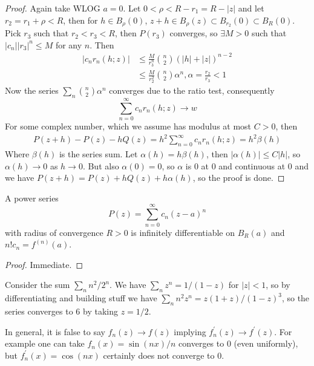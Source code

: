 \begin{proof}
    Again take WLOG $a=0$.
    Let $0<\rho<R-r_1=R-|z|$ and let $r_2=r_1+\rho<R$, then for $h\in B_\rho(0)$, $z+h\in B_\rho(z)\subset B_{r_2}(0)\subset B_R(0)$.
    Pick $r_3$ such that $r_2<r_3<R$, then $P(r_3)$ converges, so $\exists M>0$ such that $|c_n||r_3|^n\le M$ for any $n$.
    Then
    \begin{align*}
        |c_nr_n(h;z)|&\le\frac{M}{r_3^n}\binom{n}{2}(|h|+|z|)^{n-2}\\
        &\le\frac{M}{r_2^2}\binom{n}{2}\alpha^n,\alpha=\frac{r_2}{r_3}<1
    \end{align*}
    Now the series $\sum_n\binom{n}{2}\alpha^n$ converges due to the ratio test, consequently
    $$\sum_{n=0}^\infty c_nr_n(h;z)\to w$$
    For some complex number, which we assume has modulus at most $C>0$, then
    \begin{align*}
        P(z+h)-P(z)-hQ(z)=h^2\sum_{n=0}^\infty c_nr_n(h;z)=h^2\beta(h)
    \end{align*}
    Where $\beta(h)$ is the series sum.
    Let $\alpha(h)=h\beta(h)$, then $|\alpha(h)|\le C|h|$, so $\alpha(h)\to 0$ as $h\to 0$.
    But also $\alpha(0)=0$, so $\alpha$ is $0$ at $0$ and continuous at $0$ and we have $P(z+h)=P(z)+hQ(z)+h\alpha(h)$, so the proof is done.
\end{proof}
\begin{corollary}
    A power series
    $$P(z)=\sum_{n=0}^\infty c_n(z-a)^n$$
    with radius of convergence $R>0$ is infinitely differentiable on $B_R(a)$ and $n!c_n=f^{(n)}(a)$.
\end{corollary}
\begin{proof}
    Immediate.
\end{proof}
\begin{example}
    Consider the sum $\sum_nn^2/2^n$.
    We have $\sum_nz^n=1/(1-z)$ for $|z|<1$, so by differentiating and building stuff we have $\sum_nn^2z^n=z(1+z)/(1-z)^3$, so the series converges to $6$ by taking $z=1/2$.
\end{example}
\begin{remark}
    In general, it is false to say $f_n(z)\to f(z)$ implying $f_n^\prime(z)\to f^\prime(z)$.
    For example one can take $f_n(x)=\sin(nx)/n$ converges to $0$ (even uniformly), but $f_n^\prime(x)=\cos(nx)$ certainly does not converge to $0$.
\end{remark}
